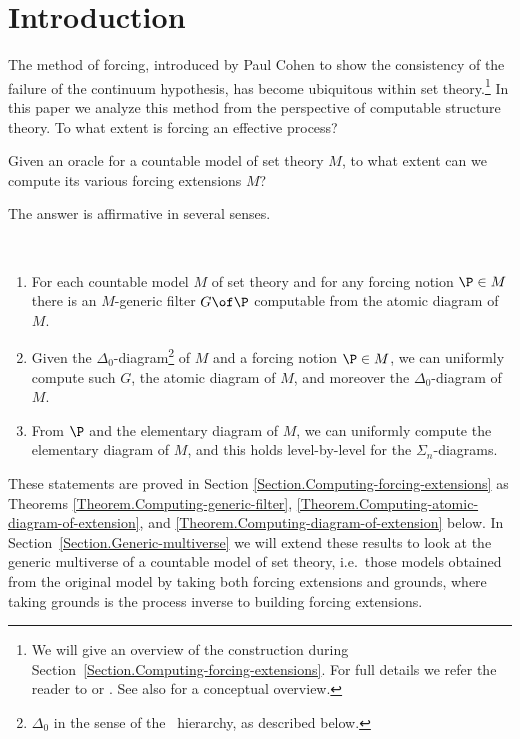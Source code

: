 \documentclass{amsart}
\begin{document}
\section{Introduction}\label{Section.Introduction}
The method of forcing, introduced by Paul Cohen to show the consistency of the failure of the continuum hypothesis,
has become ubiquitous within set theory.\footnote{We will give an overview of the construction during Section~\ref{Section.Computing-forcing-extensions}. For full details we refer the reader to \cite{Shoenfield1971:UnramifiedForcing} or \cite{Kunen1980:SetTheory}. See also \cite{Chow2007:ABeginnersGuideToForcing} for a conceptual overview.}
In this paper we analyze this method from the perspective of computable structure theory. To what extent is
forcing an effective process?
\begin{mainquestion*}
Given an oracle for a countable model of set theory $M$, to what extent can we compute its various forcing extensions $M$?
\end{mainquestion*}
The answer is affirmative in several senses.
\begin{maintheorem}\label{MainTheorem}\ \begin{enumerate}
\item
For each countable model $M$ of set theory and for any forcing notion $\P\in M$
there is an $M$-generic filter $G\of\P$ computable from the atomic diagram of $M$.
\item Given the $\Delta_0$-diagram\footnote{$\Delta_0$ in the sense of the \Levy\ hierarchy, as described below.} of $M$ and a forcing notion $\P\in M$, we can uniformly compute such $G$, the atomic diagram of $M$, and moreover the $\Delta_0$-diagram of $M$.
\item From $\P$ and the elementary diagram of $M$, we can uniformly compute the elementary diagram of $M$, and this holds level-by-level for the $\Sigma_n$-diagrams.
\end{enumerate}
\end{maintheorem}
\noindent These statements are proved in Section \ref{Section.Computing-forcing-extensions} as Theorems \ref{Theorem.Computing-generic-filter}, \ref{Theorem.Computing-atomic-diagram-of-extension}, and \ref{Theorem.Computing-diagram-of-extension} below. In Section~\ref{Section.Generic-multiverse} we will extend these results to look at the generic multiverse of a countable model of set theory, i.e.\ those models obtained from the original model by taking both forcing extensions and grounds, where taking grounds is the process inverse to building forcing extensions.
\end{document}
